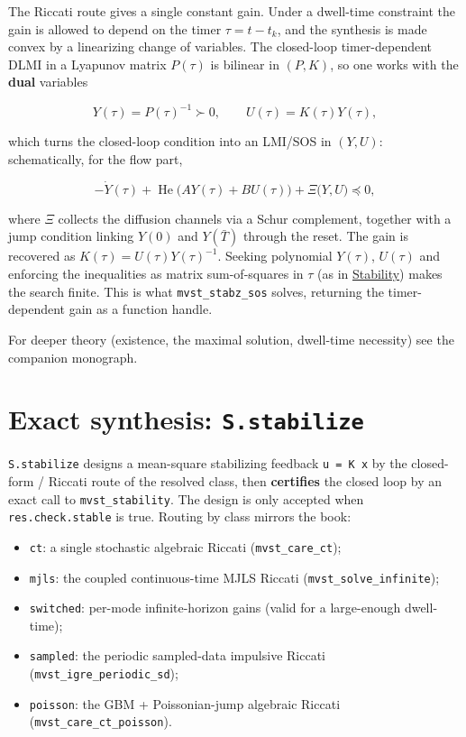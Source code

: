 \documentclass[11pt,oneside]{report}
\newcommand{\code}[1]{\texttt{#1}}
\providecommand{\tightlist}{\setlength{\itemsep}{0pt}\setlength{\parskip}{0pt}}
\begin{document}
The Riccati route gives a single constant gain. Under a dwell-time constraint the
gain is allowed to depend on the timer \(\tau=t-t_k\), and the synthesis is made
convex by a linearizing change of variables. The closed-loop timer-dependent
DLMI in a Lyapunov matrix \(P(\tau)\) is bilinear in \((P,K)\), so one works with the
\textbf{dual} variables

\[Y(\tau)=P(\tau)^{-1}\succ0,\qquad U(\tau)=K(\tau) Y(\tau),\]

which turns the closed-loop condition into an LMI/SOS in \((Y,U)\): schematically,
for the flow part,

\[-\dot Y(\tau)+\operatorname{He}\big(A Y(\tau)+B U(\tau)\big)+\Xi\big(Y,U\big)\preceq0,\]

where \(\Xi\) collects the diffusion channels via a Schur complement, together with
a jump condition linking \(Y(0)\) and \(Y(\bar T)\) through the reset. The gain is
recovered as \(K(\tau)=U(\tau)Y(\tau)^{-1}\). Seeking polynomial \(Y(\tau)\),
\(U(\tau)\) and enforcing the inequalities as matrix sum-of-squares in \(\tau\) (as
in \protect\hyperlink{chap:03-stability}{Stability}) makes the search finite. This is what
\code{mvst\_stabz\_sos} solves, returning the timer-dependent gain as a function handle.

For deeper theory (existence, the maximal solution, dwell-time necessity) see the
companion monograph.

\hypertarget{exact-synthesis-s.stabilize}{%
\section{\texorpdfstring{Exact synthesis: \code{S.stabilize}}{Exact synthesis: S.stabilize}}\label{exact-synthesis-s.stabilize}}

\code{S.stabilize} designs a mean-square stabilizing feedback \code{u = K x} by the
closed-form / Riccati route of the resolved class, then \textbf{certifies} the closed
loop by an exact call to \code{mvst\_stability}. The design is only accepted when
\code{res.check.stable} is true. Routing by class mirrors the book:

\begin{itemize}
\tightlist
\item
  \code{ct}: a single stochastic algebraic Riccati (\code{mvst\_care\_ct});
\item
  \code{mjls}: the coupled continuous-time MJLS Riccati (\code{mvst\_solve\_infinite});
\item
  \code{switched}: per-mode infinite-horizon gains (valid for a large-enough
  dwell-time);
\item
  \code{sampled}: the periodic sampled-data impulsive Riccati
  (\code{mvst\_igre\_periodic\_sd});
\item
  \code{poisson}: the GBM + Poissonian-jump algebraic Riccati (\code{mvst\_care\_ct\_poisson}).
\end{itemize}
\end{document}
